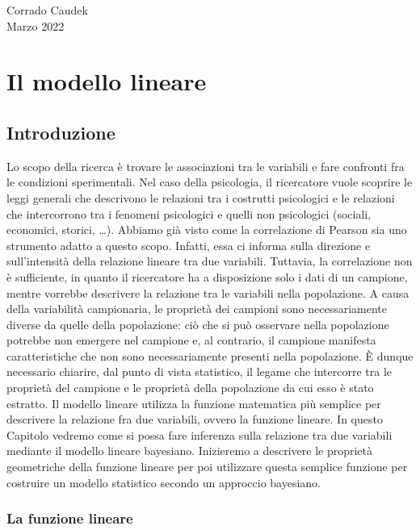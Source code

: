 \documentclass[
  11pt,
]{krantz}
\begin{document}
\begin{flushright}
Corrado Caudek\\
Marzo 2022 \end{flushright}

\mainmatter

\hypertarget{part-il-modello-lineare}{%
\part{Il modello lineare}\label{part-il-modello-lineare}}

\hypertarget{regr-models-intro}{%
\chapter{Introduzione}\label{regr-models-intro}}

Lo scopo della ricerca è trovare le associazioni tra le variabili e fare confronti fra le condizioni sperimentali. Nel caso della psicologia, il ricercatore vuole scoprire le leggi generali che descrivono le relazioni tra i costrutti psicologici e le relazioni che intercorrono tra i fenomeni psicologici e quelli non psicologici (sociali, economici, storici, \ldots). Abbiamo già visto come la correlazione di Pearson sia uno strumento adatto a questo scopo. Infatti, essa ci informa sulla direzione e sull'intensità della relazione lineare tra due variabili. Tuttavia, la correlazione non è sufficiente, in quanto il ricercatore ha a disposizione solo i dati di un campione, mentre vorrebbe descrivere la relazione tra le variabili nella popolazione. A causa della variabilità campionaria, le proprietà dei campioni sono necessariamente diverse da quelle della popolazione: ciò che si può osservare nella popolazione potrebbe non emergere nel campione e, al contrario, il campione manifesta caratteristiche che non sono necessariamente presenti nella popolazione. È dunque necessario chiarire, dal punto di vista statistico, il legame che intercorre tra le proprietà del campione e le proprietà della popolazione da cui esso è stato estratto. Il modello lineare utilizza la funzione matematica più semplice per descrivere la relazione fra due variabili, ovvero la funzione lineare. In questo Capitolo vedremo come si possa fare inferenza sulla relazione tra due variabili mediante il modello lineare bayesiano. Inizieremo a descrivere le proprietà geometriche della funzione lineare per poi utilizzare questa semplice funzione per costruire un modello statistico secondo un approccio bayesiano.

\hypertarget{la-funzione-lineare}{%
\section{La funzione lineare}\label{la-funzione-lineare}}
\end{document}
